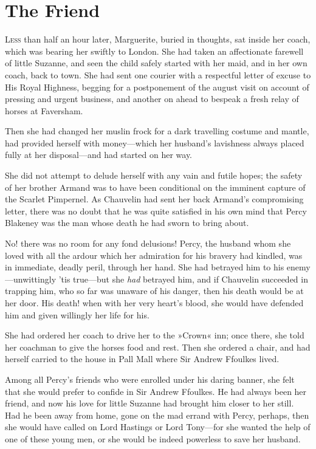 

\chapter{The Friend}
\lettrine[lines=4]{L}{ess} than half an hour later, Marguerite, buried in thoughts, sat inside her coach, which was bearing her swiftly to London. She had taken an affectionate farewell of little Suzanne, and seen the child safely started with her maid, and in her own coach, back to town. She had sent one courier with a respectful letter of excuse to His Royal Highness, begging for a postponement of the august visit on account of pressing and urgent business, and another on ahead to bespeak a fresh relay of horses at Faversham.

Then she had changed her muslin frock for a dark travelling costume and mantle, had provided herself with money—which her husband's lavishness always placed fully at her disposal—and had started on her way.

She did not attempt to delude herself with any vain and futile hopes; the safety of her brother Armand was to have been conditional on the imminent capture of the Scarlet Pimpernel. As Chauvelin had sent her back Armand's compromising letter, there was no doubt that he was quite satisfied in his own mind that Percy Blakeney was the man whose death he had sworn to bring about.

No! there was no room for any fond delusions! Percy, the husband whom she loved with all the ardour which her admiration for his bravery had kindled, was in immediate, deadly peril, through her hand. She had betrayed him to his enemy—unwittingly 'tis true—but she \textit{had} betrayed him, and if Chauvelin succeeded in trapping him, who so far was unaware of his danger, then his death would be at her door. His death! when with her very heart's blood, she would have defended him and given willingly her life for his.

She had ordered her coach to drive her to the »Crown« inn; once there, she told her coachman to give the horses food and rest. Then she ordered a chair, and had herself carried to the house in Pall Mall where Sir Andrew Ffoulkes lived.

Among all Percy's friends who were enrolled under his daring banner, she felt that she would prefer to confide in Sir Andrew Ffoulkes. He had always been her friend, and now his love for little Suzanne had brought him closer to her still. Had he been away from home, gone on the mad errand with Percy, perhaps, then she would have called on Lord Hastings or Lord Tony—for she wanted the help of one of these young men, or she would be indeed powerless to save her husband.

